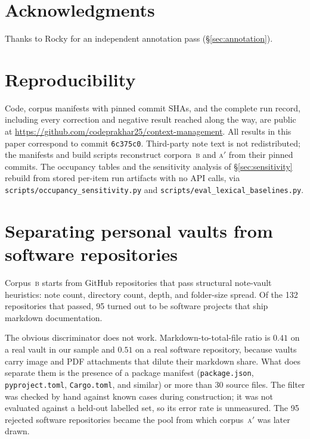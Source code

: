 \documentclass[11pt]{article}
\newcommand{\corpB}{\textsc{b}}
\newcommand{\corpAp}{\textsc{a}$'$}
\begin{document}
\section*{Acknowledgments}

Thanks to Rocky for an independent annotation pass (\S\ref{sec:annotation}).

\section*{Reproducibility}

Code, corpus manifests with pinned commit SHAs, and the complete run record, including every correction and negative result reached along the way, are public at \url{https://github.com/codeprakhar25/context-management}.
All results in this paper correspond to commit \texttt{6c375c0}.
Third-party note text is not redistributed; the manifests and build scripts reconstruct corpora~\corpB{} and \corpAp{} from their pinned commits.
The occupancy tables and the sensitivity analysis of \S\ref{sec:sensitivity} rebuild from stored per-item run artifacts with no API calls, via \texttt{scripts/occupancy\_sensitivity.py} and \texttt{scripts/eval\_lexical\_baselines.py}.



\appendix
\section{Separating personal vaults from software repositories}
\label{app:classifier}

Corpus~\corpB{} starts from GitHub repositories that pass structural note-vault heuristics: note count, directory count, depth, and folder-size spread.
Of the 132 repositories that passed, 95 turned out to be software projects that ship markdown documentation.

The obvious discriminator does not work.
Markdown-to-total-file ratio is $0.41$ on a real vault in our sample and $0.51$ on a real software repository, because vaults carry image and PDF attachments that dilute their markdown share.
What does separate them is the presence of a package manifest (\texttt{package.json}, \texttt{pyproject.toml}, \texttt{Cargo.toml}, and similar) or more than 30 source files.
The filter was checked by hand against known cases during construction; it was not evaluated against a held-out labelled set, so its error rate is unmeasured.
The 95 rejected software repositories became the pool from which corpus~\corpAp{} was later drawn.
\end{document}
